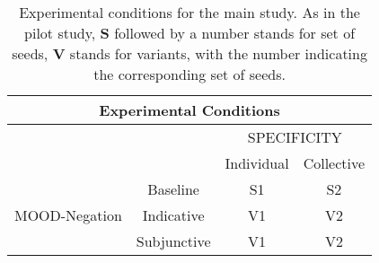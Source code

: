 \begin{table}
\centering
\begin{tabular}{|c|c|c|c|}
\hline
\multicolumn{4}{|c|}{Experimental Conditions}\\\hline
                      & &\multicolumn{2}{c|}{SPECIFICITY} \\\cline{1-4} 
                      & &Individual&Collective\\\cline{2-4} 
\multirow{3}{*}{MOOD-Negation} & Baseline & S1 & S2 \\\cline{2-4}
                      & Indicative & V1 & V2 \\\cline{2-4}
                      & Subjunctive & V1 & V2  \\ \cline{2-4}\hline                                                          
\end{tabular}

\caption[Experimental conditions main study.]{Experimental conditions for the main study. As in the pilot study, \textbf{S} followed by a number stands for set of seeds, \textbf{V} stands for variants, with the number indicating the corresponding set of seeds.}
\label{tab:design}
\end{table}

